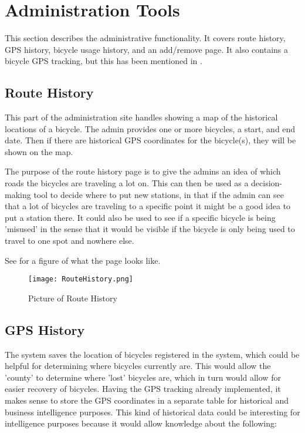 \section{Administration Tools}
This section describes the administrative functionality. 
It covers route history, GPS history, bicycle usage history, and an add/remove page.
It also contains a bicycle GPS tracking, but this has been mentioned in .

\subsection{Route History}
This part of the administration site handles showing a map of the historical locations of a bicycle.
The admin provides one or more bicycles, a start, and end date.
Then if there are historical GPS coordinates for the bicycle(s), they will be shown on the map. 

The purpose of the route history page is to give the admins an idea of which roads the bicycles are traveling a lot on. 
This can then be used as a decision-making tool to decide where to put new stations, in that if the admin can see that a lot of bicycles are traveling to a specific point it might be a good idea to put a station there.
It could also be used to see if a specific bicycle is being 'misused' in the sense that it would be visible if the bicycle is only being used to travel to one spot and nowhere else.

See  for a figure of what the page looks like.

\begin{figure}[H]
	\centering
	\texttt{[image: RouteHistory.png]}
	\caption{Picture of Route History}
	\label{fig:routehistory}
\end{figure}

\subsection{GPS History}
The system saves the location of bicycles registered in the system, which could be helpful for determining where bicycles currently are. 
This would allow the 'county' to determine where 'lost' bicycles are, which in turn would allow for easier recovery of bicycles.
Having the GPS tracking already implemented, it makes sense to store the GPS coordinates in a separate table for historical and business intelligence purposes.
This kind of historical data could be interesting for intelligence purposes because it would allow knowledge about the following:

